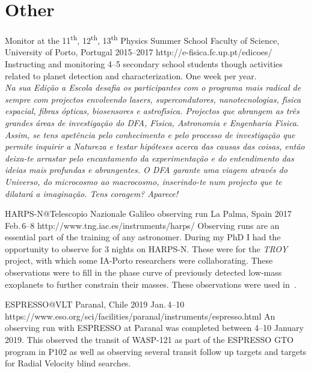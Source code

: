\section{Other}\label{app_sec:other}

{Monitor at the 11\textsuperscript{th}, 12\textsuperscript{th}, 13\textsuperscript{th} Physics Summer School}
{Faculty of Science, University of Porto, Portugal}%
{2015--2017}%
{http://e-fisica.fc.up.pt/edicoes/}%
{}%
{Instructing and monitoring 4--5 secondary school students though activities related to planet detection and characterization.
One week per year.\\
  \emph{Na sua Edi\c{c}\~{a}o a Escola desafia os participantes com o programa mais radical de sempre com projectos envolvendo lasers, supercondutores, nanotecnologias, f\'{\i}sica espacial, fibras \'{o}pticas, biosensores e astrof\'{\i}sica.
      Projectos que abrangem as tr\^{e}s grandes áreas de investiga\c{c}\~{a}o do DFA, F\'{\i}sica, Astronomia e Engenharia F\'{\i}sica.
      Assim, se tens apet\^{e}ncia pelo conhecimento e pelo processo de investiga\c{c}\~{a}o que permite inquirir a Natureza e testar hip\'{o}teses acerca das causas das coisas, ent\~{a}o deixa-te arrastar pelo encantamento da experimenta\c{c}\~{a}o e do entendimento das ideias mais profundas e abrangentes.
      O DFA garante uma viagem através do Universo, do microcosmo ao macrocosmo, inserindo-te num projecto que te dilatar\'{a} a imagina\c{c}\~{a}o.
Tens coragem? Aparece!}}%


{HARPS-N@Telescopio Nazionale Galileo observing run}
{La Palma, Spain}%
{2017 Feb.\,6--8}%
{http://www.tng.iac.es/instruments/harps/}%
{}%
{Observing runs are an essential part of the training of any astronomer.
    During my PhD I had the opportunity to observe for 3 nights on {HARPS-N}.
    These were for the \emph{TROY} project, with which some IA-Porto researchers were collaborating.
    These observations were to fill in the phase curve of previously detected low-mass exoplanets to further constrain their masses.
    These observations were used in~\citet{lillo-box_troy_2018}.
}%


{ESPRESSO@VLT}
{Paranal, Chile} %
{2019 Jan.\,4--10} %
{https://www.eso.org/sci/facilities/paranal/instruments/espresso.html} %
{} %
{An observing run with {ESPRESSO} at Paranal was completed between 4--10 January 2019.
This observed the transit of WASP-121 as part of the {ESPRESSO} {GTO} program in P102 as well as observing several transit follow up targets and targets for Radial Velocity blind searches.}
